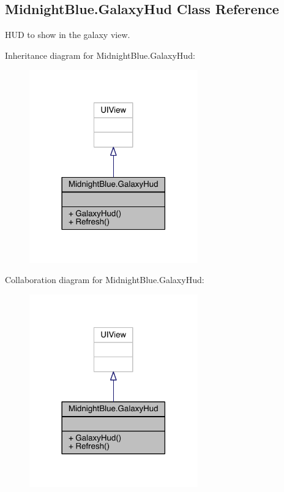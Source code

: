\hypertarget{class_midnight_blue_1_1_galaxy_hud}{}\subsection{Midnight\+Blue.\+Galaxy\+Hud Class Reference}
\label{class_midnight_blue_1_1_galaxy_hud}


H\+UD to show in the galaxy view.  




Inheritance diagram for Midnight\+Blue.\+Galaxy\+Hud\+:\nopagebreak
\begin{figure}[H]
\begin{center}
\leavevmode
\includegraphics[width=206pt]{class_midnight_blue_1_1_galaxy_hud__inherit__graph}
\end{center}
\end{figure}


Collaboration diagram for Midnight\+Blue.\+Galaxy\+Hud\+:\nopagebreak
\begin{figure}[H]
\begin{center}
\leavevmode
\includegraphics[width=206pt]{class_midnight_blue_1_1_galaxy_hud__coll__graph}
\end{center}
\end{figure}
